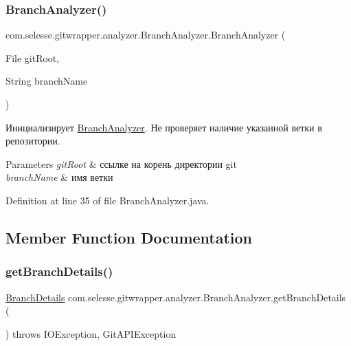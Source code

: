 \subsubsection{\texorpdfstring{Branch\+Analyzer()}{BranchAnalyzer()}}
{\footnotesize\ttfamily com.\+selesse.\+gitwrapper.\+analyzer.\+Branch\+Analyzer.\+Branch\+Analyzer (\begin{DoxyParamCaption}\item[{File}]{git\+Root,  }\item[{String}]{branch\+Name }\end{DoxyParamCaption})}

Инициализирует \hyperlink{classcom_1_1selesse_1_1gitwrapper_1_1analyzer_1_1_branch_analyzer}{Branch\+Analyzer}. Не проверяет наличие указанной ветки в репозитории.


\begin{DoxyParams}{Parameters}
{\em git\+Root} & ссылке на корень директории git \\
\hline
{\em branch\+Name} & имя ветки \\
\hline
\end{DoxyParams}


Definition at line 35 of file Branch\+Analyzer.\+java.



\subsection{Member Function Documentation}
\mbox{\label{classcom_1_1selesse_1_1gitwrapper_1_1analyzer_1_1_branch_analyzer_a1ebfd0404a1d761dbda86268a08cc329}} 
\subsubsection{\texorpdfstring{get\+Branch\+Details()}{getBranchDetails()}}
{\footnotesize\ttfamily \hyperlink{classcom_1_1selesse_1_1gitwrapper_1_1analyzer_1_1_branch_details}{Branch\+Details} com.\+selesse.\+gitwrapper.\+analyzer.\+Branch\+Analyzer.\+get\+Branch\+Details (\begin{DoxyParamCaption}{ }\end{DoxyParamCaption}) throws I\+O\+Exception, Git\+A\+P\+I\+Exception}

